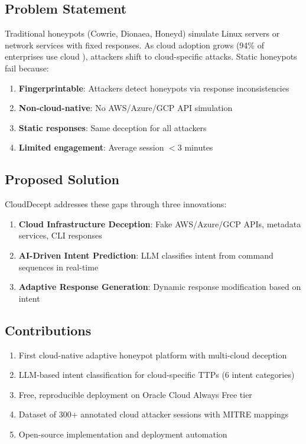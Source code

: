 \documentclass[10pt,conference]{IEEEtran}
\begin{document}
\subsection{Problem Statement}
Traditional honeypots (Cowrie, Dionaea, Honeyd) simulate Linux servers or network services with fixed responses.
As cloud adoption grows (94\% of enterprises use cloud \cite{flexera2023}), attackers shift to cloud-specific attacks.
Static honeypots fail because:
\begin{enumerate}
    \item \textbf{Fingerprintable}: Attackers detect honeypots via response inconsistencies
    \item \textbf{Non-cloud-native}: No AWS/Azure/GCP API simulation
    \item \textbf{Static responses}: Same deception for all attackers
    \item \textbf{Limited engagement}: Average session $<3$ minutes \cite{herzog2019}
\end{enumerate}

\subsection{Proposed Solution}
CloudDecept addresses these gaps through three innovations:
\begin{enumerate}
    \item \textbf{Cloud Infrastructure Deception}: Fake AWS/Azure/GCP APIs, metadata services, CLI responses
    \item \textbf{AI-Driven Intent Prediction}: LLM classifies intent from command sequences in real-time
    \item \textbf{Adaptive Response Generation}: Dynamic response modification based on intent
\end{enumerate}

\subsection{Contributions}
\begin{enumerate}
    \item First cloud-native adaptive honeypot platform with multi-cloud deception
    \item LLM-based intent classification for cloud-specific TTPs (6 intent categories)
    \item Free, reproducible deployment on Oracle Cloud Always Free tier
    \item Dataset of 300+ annotated cloud attacker sessions with MITRE mappings
    \item Open-source implementation and deployment automation
\end{enumerate}
\end{document}
